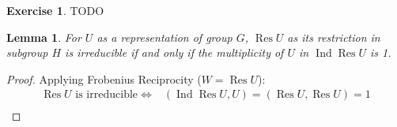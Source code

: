 \documentclass[12pt, letterpaper]{article}
\newcommand{\Res}{\operatorname{Res}}
\newcommand{\Ind}{\operatorname{Ind}}
\newcommand{\red}[1]{{\color{red} #1}}
\newtheorem{lem}[prop]{Lemma}
\theoremstyle{definition}
\theoremstyle{remark}
\theoremstyle{definition}
\newtheorem{exe}{Exercise}[section]
\theoremstyle{plain}
\numberwithin{equation}{section}
\begin{document}
	\begin{exe}
		\red{TODO}
	\end{exe}

	\begin{lem}\label{lemResIrr}
		For $U$ as a representation of group $G$,
		$\Res U$ as its restriction
		in subgroup $H$ is irreducible
		if and only if the multiplicity of 
		$U$ in
		$\Ind \Res U$ is 1.
	\end{lem}
	\begin{proof}
		Applying Frobenius Reciprocity
		($W=\Res U$):
		\[\begin{aligned}
			\Res U \text{ is irreducible}
			\iff&
			(\Ind \Res U, U)=(\Res U,\Res U)=1 \\
		\end{aligned}\]
		
	\end{proof}
\end{document}
